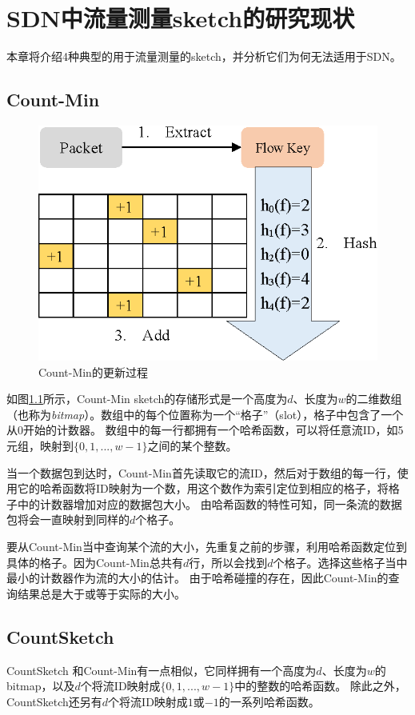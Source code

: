 \chapter{SDN中流量测量sketch的研究现状}

本章将介绍4种典型的用于流量测量的sketch，并分析它们为何无法适用于SDN。

\section{Count-Min\cite{cormode2004improved}}

\begin{figure}[h]
	\centering
	\includegraphics[width=0.8\linewidth]{fig/countmin2.eps}
	\caption{Count-Min的更新过程}\label{fig:countmin}
\end{figure}

如图\ref{fig:countmin}所示，Count-Min sketch的存储形式是一个高度为$d$、长度为$w$的二维数组（也称为\textit{bitmap}）。数组中的每个位置称为一个“格子”（slot），格子中包含了一个从0开始的计数器。
数组中的每一行都拥有一个哈希函数，可以将任意流ID，如5元组，映射到$\{0,1,...,w-1\}$之间的某个整数。

当一个数据包到达时，Count-Min首先读取它的流ID，然后对于数组的每一行，使用它的哈希函数将ID映射为一个数，用这个数作为索引定位到相应的格子，将格子中的计数器增加对应的数据包大小。
由哈希函数的特性可知，同一条流的数据包将会一直映射到同样的$d$个格子。

要从Count-Min当中查询某个流的大小，先重复之前的步骤，利用哈希函数定位到具体的格子。因为Count-Min总共有$d$行，所以会找到$d$个格子。选择这些格子当中最小的计数器作为流的大小的估计。
由于哈希碰撞的存在，因此Count-Min的查询结果总是大于或等于实际的大小。

\section{CountSketch \cite{charikar2004finding}}\label{sec:countsketch}
CountSketch \cite{charikar2004finding}和Count-Min有一点相似，它同样拥有一个高度为$d$、长度为$w$的bitmap，以及$d$个将流ID映射成$\{0,1,...,w-1\}$中的整数的哈希函数。
除此之外，CountSketch还另有$d$个将流ID映射成$1$或$-1$的一系列哈希函数。

